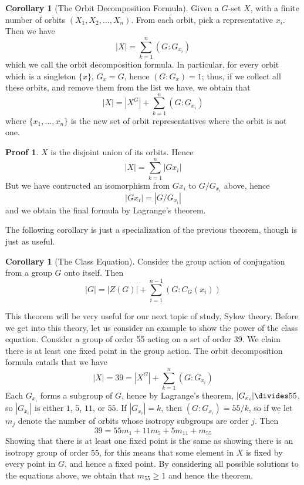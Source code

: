 \documentclass[12pt]{amsbook}
\theoremstyle{definition}
\newtheorem{corollary}[theorem]{Corollary}
\newtheorem*{prf}{Proof}
\begin{document}
\begin{corollary}[The Orbit Decomposition Formula] 
    Given a $G$-set $X$, with a finite number of orbits $(X_1, X_2, \dots, X_n)$. From each orbit, pick a representative $x_i$. Then we have
    \[ |X| = \sum_{k=1}^n (G:G_{x_i}) \]
    which we call the orbit decomposition formula. In particular, for every orbit which is a singleton $\{ x \}$, $G_x = G$, hence $(G:G_x) = 1$; thus, if we collect all these orbits, and remove them from the list we have, we obtain that
    \[ |X| = |X^G| + \sum_{k=1}^{n} (G:G_{x_i}) \]
    where $\{ x_1, \dots, x_n \}$ is the new set of orbit representatives where the orbit is not one.
\end{corollary}
\begin{prf}
    $X$ is the disjoint union of its orbits. Hence
    \[ |X| = \sum_{k=1}^n |Gx_i| \]
    But we have contructed an isomorphism from $Gx_i$ to $G/G_{x_i}$ above, hence
    \[ |Gx_i| = |G/G_{x_i}| \]
    and we obtain the final formula by Lagrange's theorem.
\end{prf}

The following corollary is just a specialization of the previous theorem, though is just as useful.

\begin{corollary}[The Class Equation] 
    Consider the group action of conjugation from a group $G$ onto itself. Then
    \[ |G| = |Z(G)| + \sum_{i = 1}^{n-1} (G:C_G(x_i)) \]
\end{corollary}

This theorem will be very useful for our next topic of study, Sylow theory. Before we get into this theory, let us consider an example to show the power of the class equation. Consider a group of order 55 acting on a set of order 39. We claim there is at least one fixed point in the group action. The orbit decomposition formula entails that we have
%
\[ |X| = 39 = |X^G| + \sum_{k=1}^n (G:G_{x_i}) \]
%
Each $G_{x_i}$ forms a subgroup of $G$, hence by Lagrange's theorem, $|G_{x_i}| \divides 55$, so $|G_{x_i}|$ is either $1$, $5$, $11$, or $55$. If $|G_{x_i}| = k$, then $(G:G_{x_i}) = 55/k$, so if we let $m_j$ denote the number of orbits whose isotropy subgroups are order $j$. Then
%
\[ 39 = 55m_1 + 11m_5 + 5m_{11} + m_{55} \]
%
Showing that there is at least one fixed point is the same as showing there is an isotropy group of order $55$, for this means that some element in $X$ is fixed by every point in $G$, and hence a fixed point. By considering all possible solutions to the equations above, we obtain that $m_{55} \geq 1$ and hence the theorem.
\end{document}
